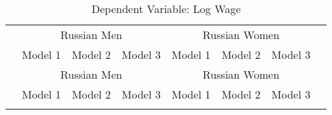\begin{longtable}{l*{3}{c}|l*{3}{c}}
	\caption{Dependent Variable: Log Wage}\\
	\toprule
	& \multicolumn{3}{c|}{Russian Men} & \multicolumn{3}{c}{Russian Women} \\
	&\multicolumn{1}{c}{Model 1}&\multicolumn{1}{c}{Model 2}&\multicolumn{1}{c|}{Model 3}&\multicolumn{1}{c}{Model 1}&\multicolumn{1}{c}{Model 2}&\multicolumn{1}{c}{Model 3}\\ 
	\midrule
	\endfirsthead
	\toprule
	& \multicolumn{3}{c|}{Russian Men} & \multicolumn{3}{c}{Russian Women} \\
	&\multicolumn{1}{c}{Model 1}&\multicolumn{1}{c}{Model 2}&\multicolumn{1}{c|}{Model 3}&\multicolumn{1}{c}{Model 1}&\multicolumn{1}{c}{Model 2}&\multicolumn{1}{c}{Model 3}\\
	\midrule
	\endhead
	\midrule
	\endfoot
	\bottomrule
	\endlastfoot
	

\end{longtable}
